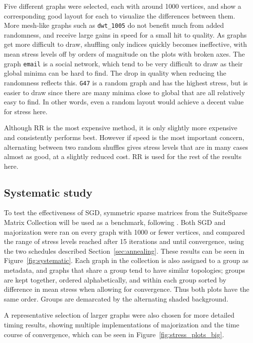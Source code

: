 Five different graphs were selected, each with around 1000 vertices, and show a corresponding good layout for each to visualize the differences between them.
More mesh-like graphs such as \texttt{dwt\_1005} do not benefit much from added randomness, and receive large gains in speed for a small hit to quality.
As graphs get more difficult to draw, shuffling only indices quickly becomes ineffective, with mean stress levels off by orders of magnitude on the plots with broken axes.
The graph \texttt{email} is a social network, which tend to be very difficult to draw as their global minima can be hard to find. The drop in quality when reducing the randomness reflects this. \texttt{G47} is a random graph and has the highest stress, but is easier to draw since there are many minima close to global that are all relatively easy to find. In other words, even a random layout would achieve a decent value for stress here.

Although RR is the most expensive method, it is only slightly more expensive and consistently performs best. However if speed is the most important concern, alternating between two random shuffles gives stress levels that are in many cases almost as good, at a slightly reduced cost.
RR is used for the rest of the results here.

\subsection{Systematic study}
\label{sec:sgd_experiment}
To test the effectiveness of SGD, symmetric sparse matrices from the SuiteSparse Matrix Collection \citep{Davis2011} will be used as a benchmark, following \citet{Khoury2012}.
Both SGD and majorization were ran on every graph with 1000 or fewer vertices, and compared the range of stress levels reached after 15 iterations and until convergence, using the two schedules described Section~\ref{sec:annealing}. These results can be seen in Figure~\ref{fig:systematic}.
Each graph in the collection is also assigned to a group as metadata, and graphs that share a group tend to have similar topologies; groups are kept together, ordered alphabetically, and within each group sorted by difference in mean stress when allowing for convergence. Thus both plots have the same order. Groups are demarcated by the alternating shaded background. 

A representative selection of larger graphs were also chosen for more detailed timing results, showing multiple implementations of majorization and the time course of convergence, which can be seen in Figure~\ref{fig:stress_plots_big}.

